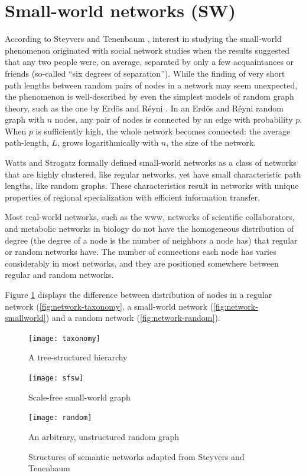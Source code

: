 \section{\hspace*{3pt} Small-world networks (SW)}

According to Steyvers and Tenenbaum \cite{steyvers2005large}, interest in studying the small-world phenomenon originated with social network studies when the results suggested that any two people were, on average, separated by only a few
acquaintances or friends (so-called ``six degrees of separation”). While the finding of very short path lengths between random pairs of nodes in a network may seem unexpected, the phenomenon is well-described by even the simplest models of random graph theory, such as the one by Erdös and Réyni \cite{erdos1960evolution}. In an Erdös and Réyni random graph with $n$ nodes, any pair of nodes is connected by an edge with probability $p$. When $p$ is sufficiently high, the whole network becomes connected: the average path-length, $L$, grows logarithmically with $n$, the size of the network.


Watts and Strogatz \cite{watts1998collective} formally defined small-world networks as a class of networks that are highly clustered, like regular networks, yet have small characteristic path lengths, like random graphs. These characteristics result in networks with unique properties of regional specialization with efficient information transfer. 

Most real-world networks, such as the \gls{www}, networks of scientific collaborators, and metabolic networks in biology do not have the homogeneous distribution of degree (the degree of a node is the number of neighbors a node has) that regular or random networks have. The number of connections each node has varies considerably in most networks, and they are positioned somewhere between regular and random networks. \cite{steyvers2005large}

Figure \ref{fig:taxonomy-networks} displays the difference between distribution of nodes in a regular network (\ref{fig:network-taxonomy}, a small-world network (\ref{fig:network-smallworld}) and a random network (\ref{fig:network-random}). 


\begin{figure}[!htb]
  \texttt{[image: taxonomy]}
  \caption{A tree-structured hierarchy}\label{fig:network-taxonomy}
\endminipage\hfill
{}
  \texttt{[image: sfsw]}
  \caption{Scale-free small-world graph}\label{fig:network-smallworld}
\endminipage\hfill
{}%
  \texttt{[image: random]}
  \caption{An arbitrary, unstructured random graph}\label{fig:network-random}
\endminipage
\caption{Structures of semantic networks adapted from Steyvers and Tenenbaum \cite{steyvers2005large}}
\label{fig:taxonomy-networks}
\end{figure}


